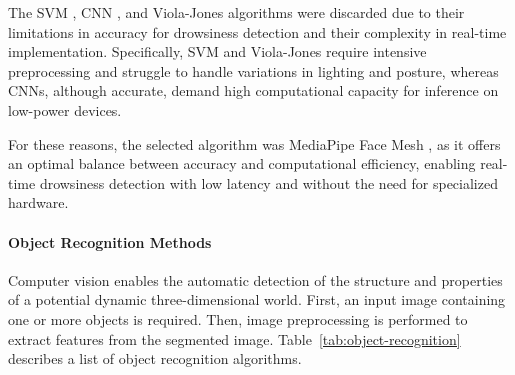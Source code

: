                 The SVM \citep{Altameem2021Early}, CNN \citep{I2022Raspberry}, and Viola-Jones \citep{Teja2021Real} algorithms were discarded due to their limitations in accuracy for drowsiness detection and their complexity in real-time implementation. Specifically, SVM and Viola-Jones require intensive preprocessing and struggle to handle variations in lighting and posture, whereas CNNs, although accurate, demand high computational capacity for inference on low-power devices.
                
                For these reasons, the selected algorithm was MediaPipe Face Mesh \citep{Shanmugam2022Comparative}, as it offers an optimal balance between accuracy and computational efficiency, enabling real-time drowsiness detection with low latency and without the need for specialized hardware.
                
                \paragraph{Object Recognition Methods}
                Computer vision enables the automatic detection of the structure and properties of a potential dynamic three-dimensional world. First, an input image containing one or more objects is required. Then, image preprocessing is performed to extract features from the segmented image. Table~\ref{tab:object-recognition} describes a list of object recognition algorithms.
                
